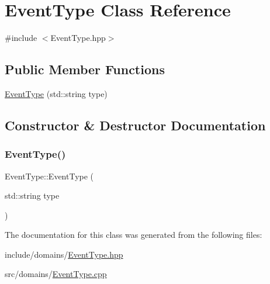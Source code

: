 \hypertarget{class_event_type}{}\section{Event\+Type Class Reference}
\label{class_event_type}


{\ttfamily \#include $<$Event\+Type.\+hpp$>$}

\subsection*{Public Member Functions}
\begin{DoxyCompactItemize}
\item 
\mbox{\hyperlink{class_event_type_a36dbb5abf9ee8443485918bdf529d257}{Event\+Type}} (std\+::string type)
\end{DoxyCompactItemize}


\subsection{Constructor \& Destructor Documentation}
\mbox{\label{class_event_type_a36dbb5abf9ee8443485918bdf529d257}} 
\subsubsection{\texorpdfstring{EventType()}{EventType()}}
{\footnotesize\ttfamily Event\+Type\+::\+Event\+Type (\begin{DoxyParamCaption}\item[{std\+::string}]{type }\end{DoxyParamCaption})}



The documentation for this class was generated from the following files\+:\begin{DoxyCompactItemize}
\item 
include/domains/\mbox{\hyperlink{_event_type_8hpp}{Event\+Type.\+hpp}}\item 
src/domains/\mbox{\hyperlink{_event_type_8cpp}{Event\+Type.\+cpp}}\end{DoxyCompactItemize}
